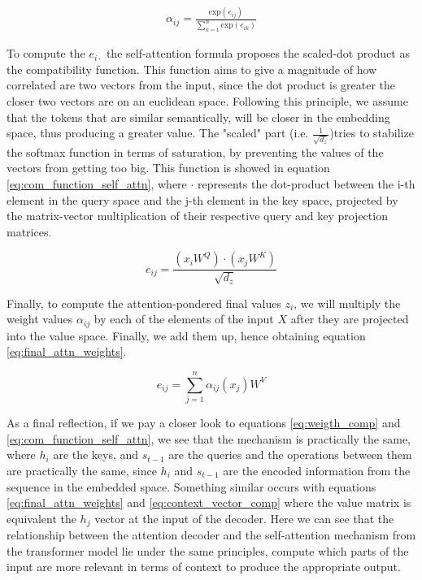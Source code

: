 \begin{equation}
	\label{eq:self_attn_weigth_comp}
	\begin{split}
		\alpha_{ij} = \frac{\text{exp}(e_{ij})}{\sum_{k=1}^{n} \text{exp}(e_{ik})}
	\end{split}
\end{equation}

To compute the $e_{i\cdot}$ the self-attention formula proposes the scaled-dot product as the compatibility function. This function aims to give a magnitude of how correlated are two vectors from the input, since the dot product is greater the closer two vectors are on an euclidean space. Following this principle, we assume that the tokens that are similar semantically, will be closer in the embedding space, thus producing a greater value. The "scaled" part (i.e. $\frac{1}{\sqrt{d_z}}$)tries to stabilize the softmax function in terms of saturation, by preventing the values of the vectors from getting too big. This function is showed in equation \ref{eq:com_function_self_attn}, where $\cdot$ represents the dot-product between the i-th element in the query space and the j-th element in the key space, projected by the matrix-vector multiplication of their respective query and key projection matrices.

\begin{equation}
	\label{eq:com_function_self_attn}
	e_{ij} = \frac{(x_i W^Q)\cdot(x_j W^K)}{\sqrt{d_z}}
\end{equation}

Finally, to compute the attention-pondered final values $z_i$, we will multiply the weight values $\alpha_{ij}$ by each of the elements of the input $X$ after they are projected into the value space. Finally, we add them up, hence obtaining equation \ref{eq:final_attn_weights}.

\begin{equation}
	\label{eq:final_attn_weights}
	e_{ij} = \sum_{j=1}^{n} \alpha_{ij}(x_j) W^V
\end{equation}

As a final reflection, if we pay a closer look to equations \ref{eq:weigth_comp} and \ref{eq:com_function_self_attn}, we see that the mechanism is practically the same, where $h_i$ are the keys, and $s_{t-1}$ are the queries and the operations between them are practically the same, since $h_i$ and $s_{t-1}$ are the encoded information from the sequence in the embedded space. Something similar occurs with equations \ref{eq:final_attn_weights} and \ref{eq:context_vector_comp} where the value matrix is equivalent the $h_j$ vector at the input of the decoder. Here we can see that the relationship between the attention decoder and the self-attention mechanism from the transformer model lie under the same principles, compute which parts of the input are more relevant in terms of context to produce the appropriate output.

